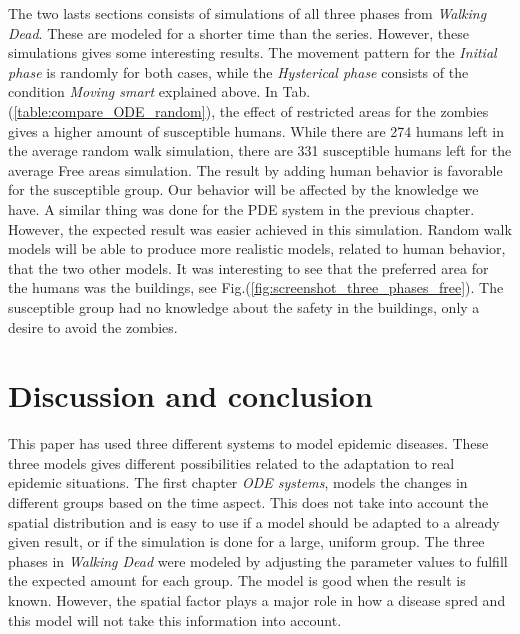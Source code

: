 \documentclass[%
twoside,                 %
final,                   %
chapterprefix=true,      %
open=right               %
10pt]{book}
\begin{document}
\vspace{3mm}




\vspace{3mm}


The two lasts sections consists of simulations of all three phases from \emph{Walking Dead}. These are modeled for a shorter time than the series. However, these simulations gives some interesting results. The movement pattern for the \emph{Initial phase} is randomly for both cases, while the \emph{Hysterical phase} consists of the condition \emph{Moving smart} explained above. In Tab.(\ref{table:compare_ODE_random}), the effect of restricted areas for the zombies gives a higher amount of susceptible humans. While there are 274 humans left in the average random walk simulation, there are 331 susceptible humans left for the average Free areas simulation. The result by adding human behavior is favorable for the susceptible group. Our behavior will be affected by the knowledge we have. A similar thing was done for the PDE system in the previous chapter. However, the expected result was easier achieved in this simulation. Random walk models will be able to produce more realistic models, related to human behavior, that the two other models. It was interesting to see that the preferred area for the humans was the buildings, see Fig.(\ref{fig:screenshot_three_phases_free}). The susceptible group had no knowledge about the safety in the buildings, only a desire to avoid the zombies. 



\chapter{Discussion and conclusion}
This paper has used three different systems to model epidemic diseases. These three models gives different possibilities related to the adaptation to real epidemic situations. The first chapter \emph{ODE systems}, models the changes in different groups based on the time aspect. This does not take into account the spatial distribution and is easy to use if a model should be adapted to a already given result, or if the simulation is done for a large, uniform group. The three phases in \emph{Walking Dead} were modeled by adjusting the parameter values to fulfill the expected amount for each group. The model is good when the result is known. However, the spatial factor plays a major role in how a disease spred and this model will not take this information into account. 
\end{document}
